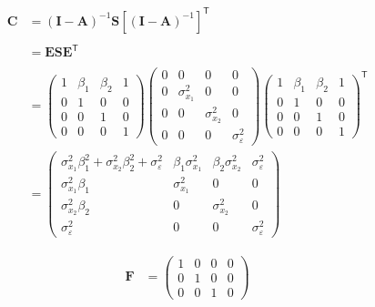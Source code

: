 \documentclass[
]{book}
\theoremstyle{definition}
\theoremstyle{definition}
\theoremstyle{definition}
\theoremstyle{remark}
\begin{document}
\begin{align*}\mathbf{C} &=\left( \mathbf{I} - \mathbf{A} \right)^{-1} \mathbf{S} \left[ \left( \mathbf{I} - \mathbf{A} \right)^{-1} \right]^{\mathsf{T}} \\\\ &=\mathbf{E} \mathbf{S} \mathbf{E}^{\mathsf{T}} \\\\ &=\left( \begin{array}{cccc} 1 & \beta  _{1} & \beta  _{2} & 1 \\ 0 & 1 & 0 & 0 \\ 0 & 0 & 1 & 0 \\ 0 & 0 & 0 & 1 \end{array} \right)\left( \begin{array}{cccc} 0 & 0 & 0 & 0 \\ 0 & \sigma  _{x_{1}} ^{2} & 0 & 0 \\ 0 & 0 & \sigma  _{x_{2}} ^{2} & 0 \\ 0 & 0 & 0 & \sigma  _{\varepsilon } ^{2} \end{array} \right)\left( \begin{array}{cccc} 1 & \beta  _{1} & \beta  _{2} & 1 \\ 0 & 1 & 0 & 0 \\ 0 & 0 & 1 & 0 \\ 0 & 0 & 0 & 1 \end{array} \right)^{\mathsf{T}}\\ &=\left( \begin{array}{cccc} \sigma  _{x_{1}} ^{2} \beta  _{1} ^{2} + \sigma  _{x_{2}} ^{2} \beta  _{2} ^{2} + \sigma  _{\varepsilon } ^{2} & \beta  _{1} \sigma  _{x_{1}} ^{2} & \beta  _{2} \sigma  _{x_{2}} ^{2} & \sigma  _{\varepsilon } ^{2} \\ \sigma  _{x_{1}} ^{2} \beta  _{1} & \sigma  _{x_{1}} ^{2} & 0 & 0 \\ \sigma  _{x_{2}} ^{2} \beta  _{2} & 0 & \sigma  _{x_{2}} ^{2} & 0 \\ \sigma  _{\varepsilon } ^{2} & 0 & 0 & \sigma  _{\varepsilon } ^{2} \end{array} \right)\end{align*}

\begin{align*}\mathbf{F} &=\left( \begin{array}{cccc} 1 & 0 & 0 & 0 \\ 0 & 1 & 0 & 0 \\ 0 & 0 & 1 & 0 \end{array} \right)\end{align*}
\end{document}
